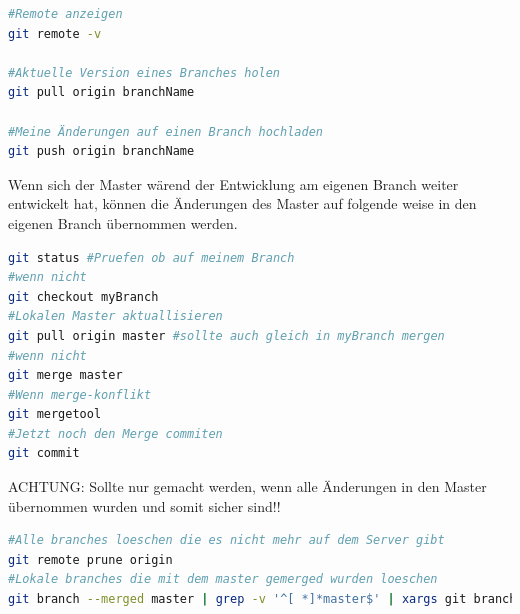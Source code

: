 \begin{lstlisting}[language=bash]
#Remote anzeigen
git remote -v

#Aktuelle Version eines Branches holen
git pull origin branchName

#Meine Änderungen auf einen Branch hochladen
git push origin branchName
\end{lstlisting}
\nsecend

Wenn sich der Master wärend der Entwicklung am eigenen Branch weiter entwickelt hat, können die Änderungen des Master auf folgende weise in den eigenen Branch übernommen werden.
\begin{lstlisting}[language=bash]
git status #Pruefen ob auf meinem Branch
#wenn nicht
git checkout myBranch
#Lokalen Master aktuallisieren
git pull origin master #sollte auch gleich in myBranch mergen
#wenn nicht
git merge master
#Wenn merge-konflikt
git mergetool
#Jetzt noch den Merge commiten
git commit
\end{lstlisting}
\nsecend

ACHTUNG: Sollte nur gemacht werden, wenn alle Änderungen in den Master übernommen wurden und somit sicher sind!!
\begin{lstlisting}[language=bash]
#Alle branches loeschen die es nicht mehr auf dem Server gibt
git remote prune origin
#Lokale branches die mit dem master gemerged wurden loeschen
git branch --merged master | grep -v '^[ *]*master$' | xargs git branch -d
\end{lstlisting}

\nsecend

\nsecend %
\nsecend %